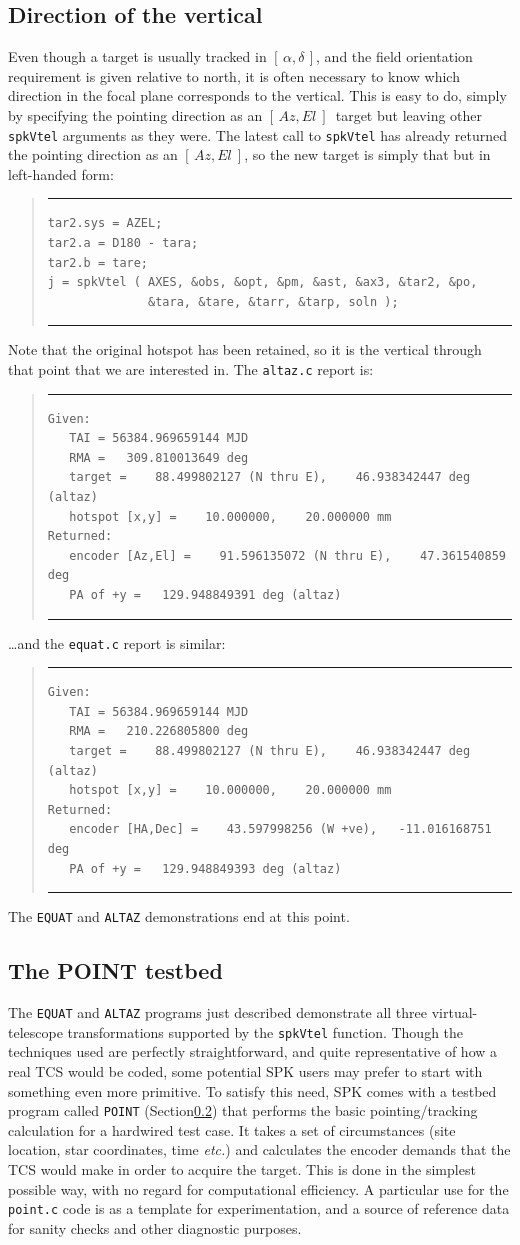 \documentclass[11pt,fleqn,twoside,\paper]{article}
\renewcommand{\_}{{\tt\char'137}}     %
\newcommand{\radec}     {$[\,\alpha,\delta\,]$}
\newcommand{\azel}      {$[\,Az,El~]$}
\newcommand{\scode}     {\goodbreak
                         \begin{quote}
                         \vspace{-6ex}
                         \rule[-2ex]{36em}{0.03ex}}
\newcommand{\ecode}     {\rule[2ex]{36em}{0.03ex}
                         \end{quote}
                         \vspace{-4ex}
                         \goodbreak}
\begin{document}
\subsection{Direction of the vertical}
Even though a target is usually tracked in \radec, and the
field orientation requirement is given relative to north, it is
often necessary to know which direction in the focal plane
corresponds to the vertical.  This is easy to do, simply by
specifying the pointing direction as
an \azel\ target but leaving other {\tt spkVtel}
arguments as they were.
The latest call to {\tt spkVtel} has already returned the
pointing direction as an \azel, so the new target is simply that
but in left-handed form:
\scode\begin{verbatim}
tar2.sys = AZEL;
tar2.a = D180 - tara;
tar2.b = tare;
j = spkVtel ( AXES, &obs, &opt, &pm, &ast, &ax3, &tar2, &po,
              &tara, &tare, &tarr, &tarp, soln );
\end{verbatim}\ecode
Note that the original hotspot has been retained, so it is the
vertical through that point that we are interested in.
The {\tt altaz.c} report is:
\scode\begin{verbatim}
Given:
   TAI = 56384.969659144 MJD
   RMA =   309.810013649 deg
   target =    88.499802127 (N thru E),    46.938342447 deg (altaz)
   hotspot [x,y] =    10.000000,    20.000000 mm
Returned:
   encoder [Az,El] =    91.596135072 (N thru E),    47.361540859 deg
   PA of +y =   129.948849391 deg (altaz)
\end{verbatim}\ecode
\ldots and the {\tt equat.c} report is similar:
\scode\begin{verbatim}
Given:
   TAI = 56384.969659144 MJD
   RMA =   210.226805800 deg
   target =    88.499802127 (N thru E),    46.938342447 deg (altaz)
   hotspot [x,y] =    10.000000,    20.000000 mm
Returned:
   encoder [HA,Dec] =    43.597998256 (W +ve),   -11.016168751 deg
   PA of +y =   129.948849393 deg (altaz)
\end{verbatim}\ecode
The {\tt EQUAT} and {\tt ALTAZ}
demonstrations end at this point.

\subsection{The POINT testbed}
\label{point}
The {\tt EQUAT} and {\tt ALTAZ} programs just described
demonstrate all three virtual-telescope transformations
supported by the {\tt spkVtel} function.  Though
the techniques used are perfectly straightforward, and
quite representative of how a real
TCS would be coded, some potential SPK users may prefer to
start with something even more primitive.  To satisfy this
need, SPK comes with a testbed program called {\tt POINT}
(Section\ref{point})
that performs the basic pointing/tracking calculation for
a hardwired test case.  It
takes a set of circumstances (site location,
star coordinates, time {\it etc.}) and calculates the encoder
demands that the TCS would make in order to acquire the target.
This is done in the simplest possible way, with no regard for
computational efficiency.  A particular use
for the {\tt point.c} code is as a template for experimentation,
and a source of reference data for sanity checks and other
diagnostic purposes.
\end{document}
